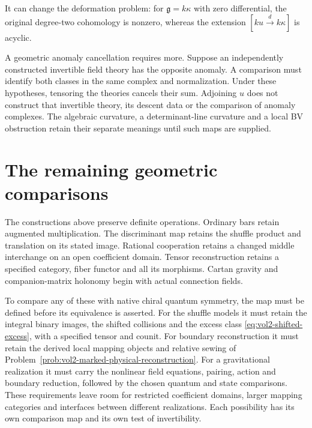 It can change the deformation problem: for
$\mathfrak g=k\kappa$ with zero differential, the original
degree-two cohomology is nonzero, whereas the extension
$[ku\xrightarrow{d}k\kappa]$ is acyclic.

A geometric anomaly cancellation requires more.
Suppose an independently constructed invertible field theory has
the opposite anomaly.
A comparison must identify both classes in the same complex and
normalization.
Under these hypotheses, tensoring the theories cancels their sum.
Adjoining $u$ does not construct that invertible theory, its
descent data or the comparison of anomaly complexes.
The algebraic curvature, a determinant-line curvature and a
local BV obstruction retain their separate meanings until
such maps are supplied.

\section{The remaining geometric comparisons}

The constructions above preserve definite operations.
Ordinary bars retain augmented multiplication.
The discriminant map retains the shuffle product and translation
on its stated image.
Rational cooperation retains a changed middle interchange on an
open coefficient domain.
Tensor reconstruction retains a specified category, fiber
functor and all its morphisms.
Cartan gravity and companion-matrix holonomy begin with actual
connection fields.

To compare any of these with native chiral quantum symmetry, the
map must be defined before its equivalence is asserted.
For the shuffle models it must retain the integral binary images,
the shifted collisions and the excess class
\eqref{eq:vol2-shifted-excess}, with a specified tensor and counit.
For boundary reconstruction it must retain the derived local
mapping objects and relative sewing of
Problem~\ref{prob:vol2-marked-physical-reconstruction}.
For a gravitational realization it must carry the nonlinear
field equations, pairing, action and boundary reduction,
followed by the chosen quantum and state comparisons.
These requirements leave room for restricted coefficient domains,
larger mapping categories and interfaces between different
realizations. Each possibility has its own comparison map and
its own test of invertibility.
